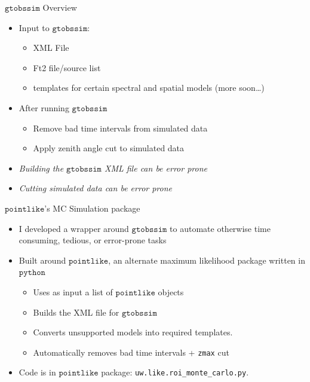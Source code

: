 \documentclass[12pt]{beamer}
\newcommand{\python}{\ensuremath{\mathtt{python}}\xspace}
\newcommand{\pointlike}{\ensuremath{\mathtt{pointlike}}\xspace}
\newcommand{\gtobssim}{\ensuremath{\mathtt{gtobssim}}\xspace}
\begin{document}
\begin{frame}{\gtobssim Overview}
  \begin{itemize}
    \item Input to \gtobssim:
      \begin{itemize}
        \item XML File
        \item Ft2 file/source list
        \item templates for certain spectral and spatial models (more soon\dots)
      \end{itemize}
    \item After running \gtobssim
      \begin{itemize}
        \item Remove bad time intervals from simulated data
        \item Apply zenith angle cut to simulated data
      \end{itemize}
    \item \em{Building the \gtobssim XML file can be error prone}
    \item \em{Cutting simulated data can be error prone}
  \end{itemize}
\end{frame}

\begin{frame}{\pointlike's MC Simulation package}
  \begin{itemize}
    \item I developed a wrapper around \gtobssim to automate
      otherwise time consuming, tedious, or error-prone tasks
    \item Built around \pointlike, an alternate maximum
      likelihood package written in \python
      \begin{itemize}
      \item Uses as input a list of \pointlike objects
        \item Builds the XML file for \gtobssim
        \item Converts unsupported models into required templates.
        \item Automatically removes bad time intervals + \texttt{zmax} cut
      \end{itemize}
    \item Code is in \pointlike package: \texttt{uw.like.roi\_monte\_carlo.py}.
  \end{itemize}
\end{frame}
\end{document}

